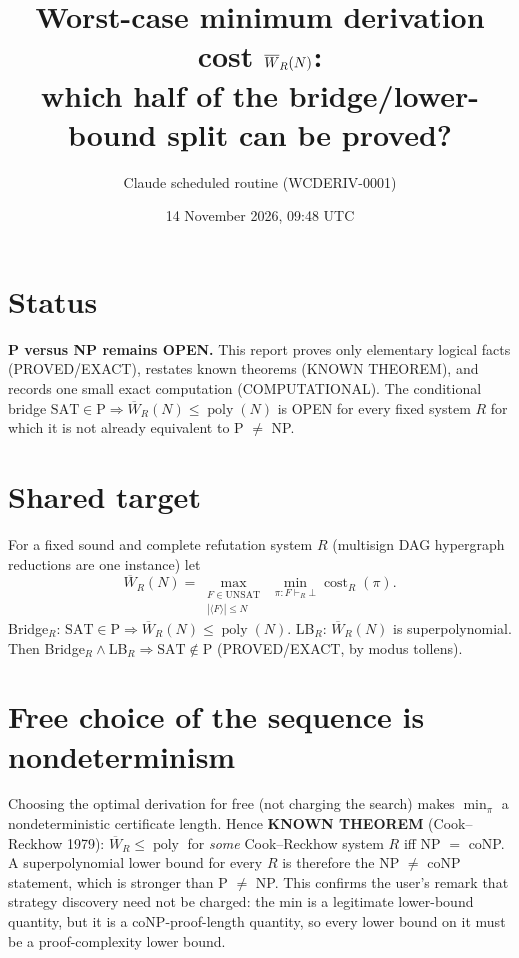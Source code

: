 \documentclass[11pt]{article}
\title{Worst-case minimum derivation cost $\W_R(N)$:\\
which half of the bridge/lower-bound split can be proved?}
\author{Claude scheduled routine (WCDERIV-0001)}
\date{14 November 2026, 09:48 UTC}
\newcommand{\W}{\overline W}
\newcommand{\SAT}{\mathrm{SAT}}
\newcommand{\poly}{\operatorname{poly}}
\begin{document}
\maketitle

\section*{Status}
\textbf{P versus NP remains OPEN.} This report proves only elementary
logical facts (PROVED/EXACT), restates known theorems (KNOWN THEOREM),
and records one small exact computation (COMPUTATIONAL). The conditional
bridge $\SAT\in\mathrm P\Rightarrow \W_R(N)\le\poly(N)$ is OPEN for every
fixed system $R$ for which it is not already equivalent to P $\ne$ NP.

\section*{Shared target}
For a fixed sound and complete refutation system $R$ (multisign DAG
hypergraph reductions are one instance) let
\[
\W_R(N)=\max_{\substack{F\in\mathrm{UNSAT}\\|\langle F\rangle|\le N}}
\ \min_{\pi:F\vdash_R\bot}\operatorname{cost}_R(\pi).
\]
Bridge$_R$: $\SAT\in\mathrm P\Rightarrow\W_R(N)\le\poly(N)$.
LB$_R$: $\W_R(N)$ is superpolynomial. Then Bridge$_R\wedge$LB$_R\Rightarrow
\SAT\notin\mathrm P$ (PROVED/EXACT, by modus tollens).

\section{Free choice of the sequence is nondeterminism}
Choosing the optimal derivation for free (not charging the search) makes
$\min_\pi$ a nondeterministic certificate length. Hence
\textbf{KNOWN THEOREM} (Cook--Reckhow 1979): $\W_R\le\poly$ for
\emph{some} Cook--Reckhow system $R$ iff NP $=$ coNP. A superpolynomial
lower bound for every $R$ is therefore the NP $\ne$ coNP statement, which
is stronger than P $\ne$ NP. This confirms the user's remark that strategy
discovery need not be charged: the min is a legitimate lower-bound
quantity, but it is a coNP-proof-length quantity, so every lower bound on
it must be a proof-complexity lower bound.
\end{document}
